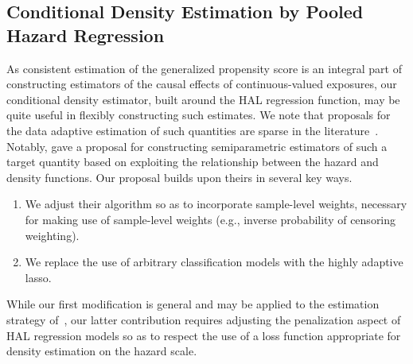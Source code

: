\subsection{Conditional Density Estimation by Pooled Hazard Regression}

As consistent estimation of the generalized propensity score is an integral part
of constructing estimators of the causal effects of continuous-valued exposures,
our conditional density estimator, built around the HAL regression function, may
be quite useful in flexibly constructing such estimates. We note that proposals
for the data adaptive estimation of such quantities are sparse in the
literature~\citep[e.g.,][]{zhu2015boosting}. Notably, \citet{diaz2011super} gave
a proposal for constructing semiparametric estimators of such a target quantity
based on exploiting the relationship between the hazard and density functions.
Our proposal builds upon theirs in several key ways.
\begin{enumerate}[topsep=0.5pt,itemsep=0pt,partopsep=1ex,parsep=1ex]
  \item We adjust their algorithm so as to incorporate sample-level weights,
     necessary for making use of sample-level weights (e.g., inverse probability
     of censoring weighting).
  \item We replace the use of arbitrary classification models with the highly
  adaptive lasso.
\end{enumerate}
While our first modification is general and may be applied to the estimation
strategy of~\citet{diaz2011super}, our latter contribution requires adjusting
the penalization aspect of HAL regression models so as to respect the use of
a loss function appropriate for density estimation on the hazard scale.

